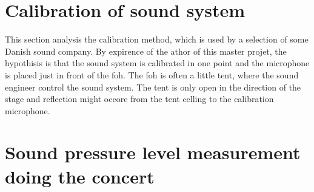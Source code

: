 \section{Calibration of sound system}
This section analysis the calibration method, which is used by a selection of some Danish sound company. By expirence of the athor of this master projet, the hypothisis is that the sound system is calibrated in one point and the microphone is placed just in front of the \gls{foh}. The \gls{foh} is often a little tent, where the sound engineer control the sound system. The tent is only open in the direction of the stage and reflection might occore from the tent celling to the calibration microphone. 

\section{Sound pressure level measurement doing the concert}
